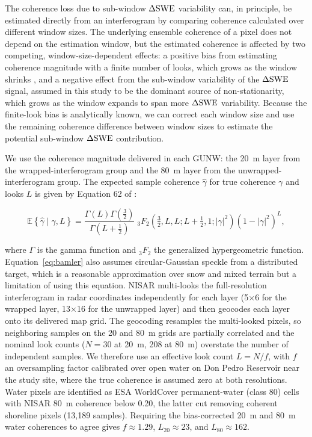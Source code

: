 \documentclass[journal abbreviation, manuscript]{copernicus}
\begin{document}
The coherence loss due to sub-window $\Delta\mathrm{SWE}$ variability can, in principle, be estimated directly from an interferogram by comparing coherence calculated over different window sizes. The underlying ensemble coherence of a pixel does not depend on the estimation window, but the estimated coherence is affected by two competing, window-size-dependent effects: a positive bias from estimating coherence magnitude with a finite number of looks, which grows as the window shrinks \citep{Bamler1998}, and a negative effect from the sub-window variability of the $\Delta\mathrm{SWE}$ signal, assumed in this study to be the dominant source of non-stationarity, which grows as the window expands to span more $\Delta\mathrm{SWE}$ variability. Because the finite-look bias is analytically known, we can correct each window size and use the remaining coherence difference between window sizes to estimate the potential sub-window $\Delta\mathrm{SWE}$ contribution.

We use the coherence magnitude delivered in each GUNW: the 20~m layer from the wrapped-interferogram group and the 80~m layer from the unwrapped-interferogram group. The expected sample coherence $\hat{\gamma}$ for true coherence $\gamma$ and looks $L$ is given by Equation 62 of \citet{Bamler1998}: 

\begin{equation}
\mathbb{E}\!\left\{\hat{\gamma}\mid\gamma,L\right\}
= \frac{\Gamma(L)\Gamma\!\left(\tfrac{3}{2}\right)}{\Gamma\!\left(L+\tfrac{1}{2}\right)}\;
{}_{3}F_{2}\!\left(\tfrac{3}{2},L,L;L+\tfrac{1}{2},1;|\gamma|^{2}\right)
\left(1-|\gamma|^{2}\right)^{L},
\label{eq:bamler}
\end{equation}

\noindent where $\Gamma$ is the gamma function and ${}_{3}F_{2}$ the generalized hypergeometric function. Equation~\ref{eq:bamler} also assumes circular-Gaussian speckle from a distributed target, which is a reasonable approximation over snow and mixed terrain but a limitation of using this equation. NISAR multi-looks the full-resolution interferogram in radar coordinates independently for each layer (5$\times$6 for the wrapped layer, 13$\times$16 for the unwrapped layer) and then geocodes each layer onto its delivered map grid. The geocoding resamples the multi-looked pixels, so neighboring samples on the 20 and 80~m grids are partially correlated and the nominal look counts ($N = 30$ at 20~m, 208 at 80~m) overstate the number of independent samples. We therefore use an effective look count $L=N/f$, with $f$ an oversampling factor calibrated over open water on Don Pedro Reservoir near the study site, where the true coherence is assumed zero at both resolutions. Water pixels are identified as ESA WorldCover permanent-water (class 80) cells with NISAR 80~m coherence below 0.20, the latter cut removing coherent shoreline pixels (13,189 samples). Requiring the bias-corrected 20~m and 80~m water coherences to agree gives $f \approx 1.29$, $L_{20} \approx 23$, and $L_{80} \approx 162$.
\end{document}
